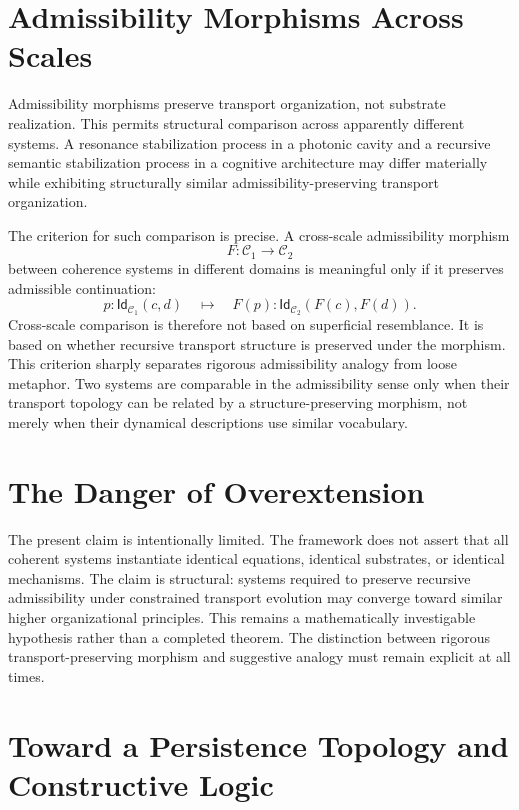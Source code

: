 \documentclass[11pt,openany]{book}
\theoremstyle{definition}
\theoremstyle{plain}
\newcommand{\idtype}{\mathsf{Id}}
\begin{document}
\section{Admissibility Morphisms Across Scales}

Admissibility morphisms preserve transport organization, not substrate realization. This permits structural comparison across apparently different systems. A resonance stabilization process in a photonic cavity and a recursive semantic stabilization process in a cognitive architecture may differ materially while exhibiting structurally similar admissibility-preserving transport organization.

The criterion for such comparison is precise. A cross-scale admissibility morphism
\[
F : \mathcal{C}_1 \to \mathcal{C}_2
\]
between coherence systems in different domains is meaningful only if it preserves admissible continuation:
\[
p : \idtype_{\mathcal{C}_1}(c,d) \quad\mapsto\quad F(p) : \idtype_{\mathcal{C}_2}(F(c),F(d)).
\]
Cross-scale comparison is therefore not based on superficial resemblance. It is based on whether recursive transport structure is preserved under the morphism. This criterion sharply separates rigorous admissibility analogy from loose metaphor. Two systems are comparable in the admissibility sense only when their transport topology can be related by a structure-preserving morphism, not merely when their dynamical descriptions use similar vocabulary.

\section{The Danger of Overextension}

The present claim is intentionally limited. The framework does not assert that all coherent systems instantiate identical equations, identical substrates, or identical mechanisms. The claim is structural: systems required to preserve recursive admissibility under constrained transport evolution may converge toward similar higher organizational principles. This remains a mathematically investigable hypothesis rather than a completed theorem. The distinction between rigorous transport-preserving morphism and suggestive analogy must remain explicit at all times.

\section{Toward a Persistence Topology and Constructive Logic}
\end{document}
